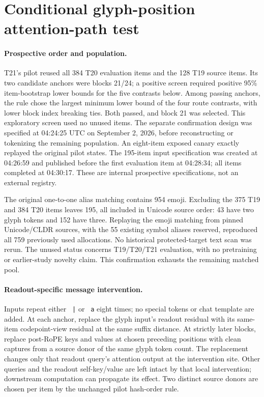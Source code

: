 \documentclass{article}
\begin{document}
\section{Conditional glyph-position attention-path test}
\label{app:t21}

\paragraph{Prospective order and population.}
T21's pilot reused all 384 T20 evaluation items and the 128 T19 source items.
Its two candidate anchors were blocks 21/24; a positive screen required
positive 95\% item-bootstrap lower bounds for the five contrasts below.
Among passing anchors, the rule chose the largest minimum lower bound of
the four route contrasts, with lower block index breaking ties. Both passed,
and block 21 was selected. This exploratory screen used no unused items.
The separate confirmation design was specified at 04:24:25 UTC on September
2, 2026, before reconstructing or tokenizing the remaining population. An
eight-item exposed canary exactly replayed the original pilot states. The
195-item input specification was created at 04:26:59 and published before
the first evaluation item at 04:28:34; all items completed at 04:30:17.
These are internal prospective specifications, not an external registry.

The original one-to-one alias matching contains 954 emoji. Excluding the
375 T19 and 384 T20 items leaves 195, all included in Unicode source order:
43 have two glyph tokens and 152 have three. Replaying the emoji matching
from pinned Unicode/CLDR sources, with the 55 existing symbol aliases
reserved, reproduced all 759 previously used allocations. No historical
protected-target text scan was rerun. The unused status concerns T19/T20/T21
evaluation, with no pretraining or earlier-study novelty claim. This
confirmation exhausts the remaining matched pool.

\paragraph{Readout-specific message intervention.}
Inputs repeat either \texttt{ |} or \texttt{ a} eight times; no special tokens
or chat template are added. At each anchor, replace the glyph input's
readout residual with its same-item codepoint-view residual at the same
suffix distance. At strictly later blocks, replace post-RoPE keys and values
at chosen preceding positions with clean captures from a source donor of
the same glyph token count. The replacement changes only that readout
query's attention output at the intervention site. Other queries and the
readout self-key/value are left intact by that local intervention;
downstream computation can propagate its effect. Two distinct source
donors are chosen per item by the unchanged pilot hash-order rule.
\end{document}
